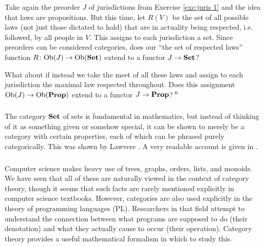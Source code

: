 \documentclass[CT4S-EN-RU]{subfiles}
\begin{document}
\begin{exerciseENG}\label{exc:juris 2}
Take again the preorder $J$ of jurisdictions from Exercise \ref{exc:juris 1} and the idea that laws are propositions. But this time, let $R(V)$ be the set of all possible laws (not just those dictated to hold) that are in actuality being respected, i.e. followed, by all people in $V$. This assigns to each jurisdiction a set.
\sexc Since preorders can be considered categories, does our “the set of respected laws” function $R\colon\textnormal{Ob}(J)\rightarrow\textnormal{Ob}({\bf Set})$ extend to a functor $J\rightarrow{\bf Set}$? 
\item What about if instead we take the meet of all these laws and assign to each jurisdiction the maximal law respected throughout. Does this assignment $\textnormal{Ob}(J)\rightarrow\textnormal{Ob}({\bf Prop})$ extend to a functor $J\rightarrow{\bf Prop}$?$~^{\arabic{footnote}}$
\endsexc
\end{exerciseENG}

\begin{exerciseRUS}\label{exc:juris 2}
\end{exerciseRUS}


\subsubsection{}

\begin{blockENG}
The category ${\bf Set}$ of sets is fundamental in mathematics, but instead of thinking of it as something given or somehow special, it can be shown to merely be a category with certain properties, each of which can be phrased purely categorically. This was shown by Lawvere \cite{Law}. A very readable account is given in \cite{Le2}.
\end{blockENG}

\begin{blockRUS}
\end{blockRUS}


\subsubsection{}

\begin{blockENG}
Computer science makes heavy use of trees, graphs, orders, lists, and monoids. We have seen that all of these are naturally viewed in the context of category theory, though it seems that such facts are rarely mentioned explicitly in computer science textbooks. However, categories are also used explicitly in the theory of programming languages (PL). Researchers in that field attempt to understand the connection between what programs are supposed to do (their denotation) and what they actually cause to occur (their operation). Category theory provides a useful mathematical formalism in which to study this.
\end{blockENG}
\end{document}
